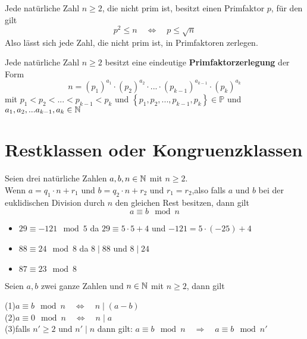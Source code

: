 \documentclass[main.tex]{subfiles}
\begin{document}
\begin{Theorem}
	Jede natürliche Zahl $n\geq2$, die nicht prim ist, besitzt einen Primfaktor $p$, für den gilt
	$$p^2\leq n \quad\Leftrightarrow\quad p\leq \sqrt{n}$$
	Also lässt sich jede Zahl, die nicht prim ist, in Primfaktoren zerlegen.

	Jede natürliche Zahl $n\geq2$ besitzt eine eindeutige \textbf{Primfaktorzerlegung} der Form
	$$n=(p_{1})^{a_{1}} \cdot (p_{2})^{a_{2}} \cdot ... \cdot (p_{k-1})^{a_{k-1}} \cdot (p_{k})^{a_{k}}   $$
	mit $p_{1}< p_{2}< ... < p_{k-1}< p_{k}$ \quad und \quad $ \left\{ p_{1}, p_{2}, ... , p_{k-1}, p_{k} \right\} \in \mathbb{P}$ \quad und \quad $a_{1}, a_{2}, ...  a_{k-1}, a_{k} \in \mathbb{N} $
\end{Theorem}


\section{Restklassen oder Kongruenzklassen}

\begin{Definition}
	Seien drei natürliche Zahlen $a, b, n \in \mathbb{N}$ mit $n\geq 2$.\\ Wenn $a=q_{1} \cdot n + r_{1}$  \qquad und \qquad  $b=q_{2} \cdot n + r_{2}$ \qquad und \quad $r_{1}=r_{2}$,\qquad also falls $a$ und $b$ bei der euklidischen Division durch $n$ den gleichen Rest besitzen, dann gilt
	$$a \equiv b\mod n$$
\end{Definition}

\begin{Beispiel}
	\begin{itemize}
		\item $29\equiv-121 \mod 5 $ \quad da $29 \equiv 5\cdot 5 +4$ \quad und \quad $-121 = 5\cdot (-25) +4$
		\item $88\equiv 24 \mod 8 $ \quad da $8\mid 88$ \quad und \quad $8\mid 24$
		\item $87\equiv 23 \mod 8$
	\end{itemize}
\end{Beispiel}

\begin{Theorem}
	Seien $a,b$ zwei ganze Zahlen und $n\in\mathbb{N}$ mit $n\geq 2$, dann gilt
	
	(1)\qquad $ a\equiv b \mod n \quad \Leftrightarrow \quad n\mid (a-b)$\\
	(2)\qquad $ a\equiv 0 \mod n \quad\Leftrightarrow\quad n\mid a$\\
	(3)\qquad falls $n'\geq 2$ und $n'\mid n$ dann gilt: \quad $a \equiv b \mod n \quad \Rightarrow \quad a \equiv b \mod n' $\\\\
\end{Theorem}
\end{document}
